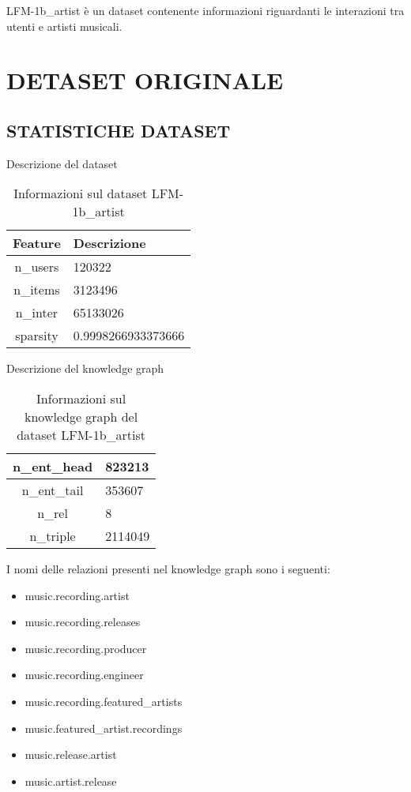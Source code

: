 
\noindent LFM-1b\_artist è un dataset contenente informazioni riguardanti le interazioni tra utenti e artisti musicali.

\section*{DETASET ORIGINALE}

\subsection*{STATISTICHE DATASET}


Descrizione del dataset
\begin{table}[H]
    \centering
    \begin{tabularx}{\textwidth}{|c|X|}
        \hline
        \textbf{Feature} & \textbf{Descrizione} \\
        \hline
        n\_users & 120322 \\
        \hline
        n\_items & 3123496 \\
        \hline
        n\_inter & 65133026 \\
        \hline
        sparsity & 0.9998266933373666 \\
        \hline
    \end{tabularx}
    \caption{Informazioni sul dataset LFM-1b\_artist}
    \label{tab:dataset_info}
\end{table}


\noindent Descrizione del knowledge graph
\begin{table}[H]
    \centering
    \begin{tabularx}{\textwidth}{|c|X|}
        \hline
        n\_ent\_head & 823213 \\
        \hline
        n\_ent\_tail & 353607 \\
        \hline
        n\_rel & 8 \\
        \hline
        n\_triple & 2114049 \\
        \hline
    \end{tabularx}
    \caption{Informazioni sul knowledge graph del dataset LFM-1b\_artist}
    \label{tab:dataset_info}
\end{table}

\newpage
\noindent I nomi delle relazioni presenti nel knowledge graph sono i seguenti:
\begin{itemize}
    \item music.recording.artist
    \item music.recording.releases
    \item music.recording.producer
    \item music.recording.engineer
    \item music.recording.featured\_artists
    \item music.featured\_artist.recordings
    \item music.release.artist
    \item music.artist.release
\end{itemize}

